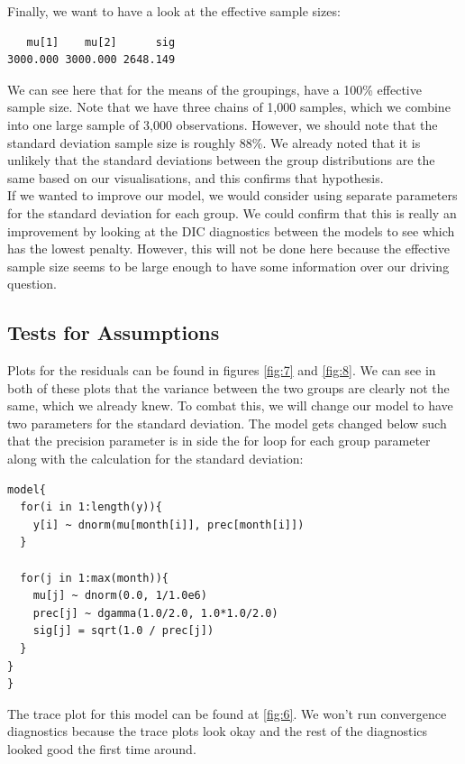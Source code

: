 \documentclass[journal, a4paper]{IEEEtran}
\begin{document}
Finally, we want to have a look at the effective sample sizes:\\

\begin{verbatim}
   mu[1]    mu[2]      sig 
3000.000 3000.000 2648.149 
\end{verbatim}

We can see here that for the means of the groupings, have a 100\% effective sample size. Note that we have three chains of 1,000 samples, which we combine into
one large sample of 3,000 observations. However, we should note that the standard deviation sample size is roughly 88\%. We already noted that it is unlikely
that the standard deviations between the group distributions are the same based on our visualisations, and this confirms that hypothesis.\\

If we wanted to improve our model, we would consider using separate parameters for the standard deviation for each group. We could confirm that this is really
an improvement by looking at the DIC diagnostics between the models to see which has the lowest penalty. However, this will not be done here because the 
effective sample size seems to be large enough to have some information over our driving question.

\subsection{Tests for Assumptions}

Plots for the residuals can be found in figures \ref{fig:7} and \ref{fig:8}. We can see in both of these plots that the variance between the two groups are 
clearly not the same, which we already knew. To combat this, we will change our model to have two parameters for the standard deviation. The model gets changed
below such that the precision parameter is in side the for loop for each group parameter along with the calculation for the standard deviation:\\

\begin{lstlisting}
model{
  for(i in 1:length(y)){
    y[i] ~ dnorm(mu[month[i]], prec[month[i]])
  }
  
  for(j in 1:max(month)){
    mu[j] ~ dnorm(0.0, 1/1.0e6)
    prec[j] ~ dgamma(1.0/2.0, 1.0*1.0/2.0)
    sig[j] = sqrt(1.0 / prec[j])
  }
}
}
\end{lstlisting}

The trace plot for this model can be found at \ref{fig:6}. We won't run convergence diagnostics because the trace plots look okay and the rest of the 
diagnostics looked good the first time around.\\
\end{document}
